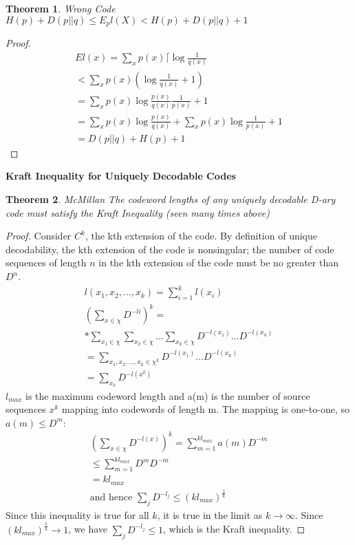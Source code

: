 \documentclass[10pt]{article}
\newtheorem{thm}{Theorem}[section]
\begin{document}
\begin{tiny}
\begin{multicols}{3}
\begin{thm}{Wrong Code}
$H(p)+D(p||q) \leq E_pl(X)<H(p)+D(p||q)+1$
\end{thm}
\begin{proof}
    \begin{eqnarray}
El(x) = \sum_x p(x) \lceil\log \frac{1}{q(x)} \\
< \sum_x p(x) (\log \frac{1}{q(x)} + 1) \\
= \sum_x p(x) \log \frac{p(x)}{q(x)} \frac{1}{p(x)} + 1 \\
= \sum_x p(x) \log \frac{p(x)}{q(x)} + \sum_x p(x) \log \frac{1}{p(x)} + 1 \\
= D(p||q) + H(p) + 1
\end{eqnarray}
\end{proof}




\textbf{\scriptsize Kraft Inequality for Uniquely Decodable Codes}
\begin{thm}{McMillan} \label{thm: mcmillan}
The codeword lengths of any uniquely decodable D-ary code must satisfy the Kraft Inequality (seen many times above) 
\end{thm}
\begin{proof}
Consider ${C^{k}}$, the kth extension of the code. By definition of unique decodability, the kth extension of the code is nonsingular; 
the number of code sequences of length ${n}$ in the kth extension of the code must be no greater than ${D^{n}}$. 
\begin{eqnarray}
l({x_1},{x_2}, \ldots , {x_k}) = \sum_{i=1}^{k} l({x_i})\\
(\sum_{x\in \chi} D^{-li})^{k} = \\*
\sum_{x_1\in\chi}\sum_{x_2\in\chi} \ldots \sum_{x_k\in\chi}  D^{-l({x_1})} \ldots D^{-l({x_k})}\\
=\sum_{{x_1},{x_2}, \ldots , {x_k} \in \chi^{k}}  D^{-l({x_1})}\ldots D^{-l({x_k})} \\
=\sum_{x_k} D^{-l({x^{k}})}
\end{eqnarray}
${l_{max}}$ is the maximum codeword length and a(m) is the number of source sequences
${x^{k}}$ mapping into codewords of length m. The mapping is one-to-one, so $a(m) \leq D^{m}$:
\begin{eqnarray}
(\sum_{x\in\chi} D^{-l(x)})^{k} = \sum_{m=1}^{kl_{max}} a(m)D^{-m}\\
\leq \sum_{m=1}^{kl_{max}} D^{m}D^{-m}\\
=kl_{max}\\
\text{and hence } \sum_j D^{-l_j} \leq (kl_{max})^{\frac{1}{k}}
\end{eqnarray}
Since this inequality is true for all ${k}$, it is true in the limit as ${k} \rightarrow \infty$.
Since ${(kl_{max})^{\frac{1}{k}}} \rightarrow 1$, we have 
$\sum_j D^{-l_j} \leq 1$, which is the Kraft inequality.
\end{proof}


\end{multicols}
\end{tiny}
\end{document}
